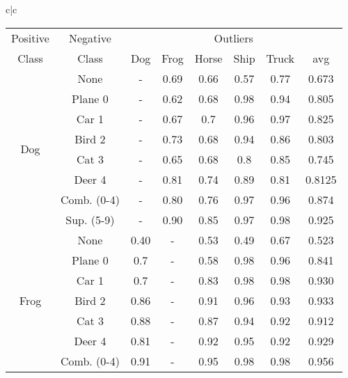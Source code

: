 \documentclass[acmtog, nonacm]{acmart}
\begin{document}
\begin{tabular}{c|c}
     \begin{tabular}{@{}c|c|ccccc|c@{}}
\midrule
Positive & Negative&\multicolumn{6}{c}{Outliers} \\
\hspace{.25em}Class &\hspace{.25em}Class & Dog & Frog  & Horse & Ship  & Truck & avg\\
\midrule
\multirow{8}{*}{Dog}   &None                       & -    & 0.69 & 0.66  & 0.57 & 0.77  & 0.673                      \\
                       & Plane 0                   & -    & 0.62 & 0.68  & 0.98 & 0.94  & 0.805                \\
                       & Car 1                     & -    & 0.67 & 0.7   & 0.96 & 0.97  & 0.825                \\
                       & Bird 2                    & -    & 0.73 & 0.68  & 0.94 & 0.86  & 0.803               \\
                       & Cat 3                     & -    & 0.65 & 0.68  & 0.8  & 0.85  & 0.745                \\
                       & Deer 4                    & -    & 0.81 & 0.74  & 0.89 & 0.81  & 0.8125               \\
                       & Comb. (0-4)               & -    & 0.80 & 0.76  & 0.97 & 0.96  & 0.874                \\
                       & Sup. (5-9)                & -    & 0.90 & 0.85  & 0.97 & 0.98  & 0.925                \\
                       \midrule
\multirow{8}{*}{Frog}  & None                      & 0.40 & -    & 0.53  & 0.49 & 0.67  & 0.523                \\
                       & Plane 0                   & 0.7  & -    & 0.58  & 0.98 & 0.96  & 0.841                \\
                       & Car 1                     & 0.7  & -    & 0.83  & 0.98 & 0.98  & 0.930                \\
                       & Bird 2                    & 0.86 & -    & 0.91  & 0.96 & 0.93  & 0.933                \\
                       & Cat 3                     & 0.88 & -    & 0.87  & 0.94 & 0.92  & 0.912                \\
                       & Deer 4                    & 0.81 & -    & 0.92  & 0.95 & 0.92  & 0.929                \\
                       & Comb. (0-4)               & 0.91 & -    & 0.95  & 0.98 & 0.98  & 0.956                \\

\end{tabular}
\end{tabular}
\end{document}
